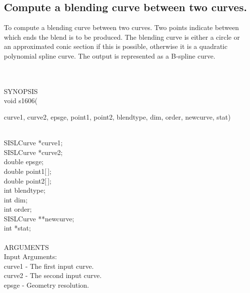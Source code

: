 \subsection{Compute a blending curve between two curves.}
\begin{minipg1}
  To compute a blending curve between two curves.
  Two points indicate between which
  ends the blend is to be produced.
  The blending curve is either a circle or
  an approximated conic section if this is
  possible, otherwise it is a quadratic polynomial spline curve.
  The output is represented as a B-spline curve.
\end{minipg1} \\ \\
SYNOPSIS\\
        \>void s1606(\begin{minipg3}
        {\fov curve1}, {\fov curve2}, {\fov epsge}, {\fov point1}, {\fov point2},
        {\fov blendtype}, {\fov dim}, {\fov order}, {\fov newcurve}, {\fov stat})
                \end{minipg3}\\[0.3ex]
                \>\>    SISLCurve       \>      *{\fov curve1};\\
                \>\>    SISLCurve       \>      *{\fov curve2};\\
                \>\>    double  \>      {\fov epsge};\\
                \>\>    double  \>      {\fov point1}[\,];\\
                \>\>    double  \>      {\fov point2}[\,];\\
                \>\>    int     \>      {\fov blendtype};\\
                \>\>    int     \>      {\fov dim;}\\
                \>\>    int     \>      {\fov order};\\
                \>\>    SISLCurve       \>      **{\fov newcurve};\\
                \>\>    int     \>      *{\fov stat};\\
\\
ARGUMENTS\\
        \>Input Arguments:\\
        \>\>    {\fov curve1}   \> - \> The first input curve.\\
        \>\>    {\fov curve2}   \> - \> The second input curve.\\
        \>\>    {\fov epsge}    \> - \> Geometry resolution.\\
